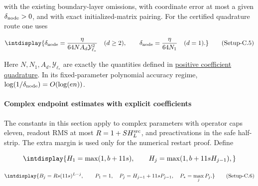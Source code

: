 
with the existing boundary-layer omissions, with coordinate error at most a given \(\delta_{\rm node}>0\), and with exact initialized-matrix pairing. For the certified quadrature route one uses


\label{int:eq-setup-c-5}
\begingroup\renewcommand{\theHequation}{intdisplay.918}
\begin{equation}
\intdisplay{
\delta_{\rm node}=\frac{\eta}{64N A_d\mathcal Y_{\ell_*}^2}\quad(d\ge2),
\qquad \delta_{\rm node}=\frac{\eta}{64N_1}\quad(d=1).
}
\tag{Setup-C.5}
\label{int:eq-0461-setup-c-5}
\end{equation}
\endgroup


Here \(N,\allowbreak N_1,\allowbreak A_d,\allowbreak \mathcal Y_{\ell_*}\) are exactly the quantities defined in \hyperref[int:setup-quadrature]{positive coefficient quadrature}. In its fixed-parameter polynomial accuracy regime, \(\log(1/\delta_{\rm node})=O(\log(en))\).


\paragraph{Complex endpoint estimates with explicit coefficients}
\label{int:setup-core-2}
\mbox{}\par\smallskip


The constants in this section apply to complex parameters with operator caps eleven, readout RMS at most \(R=1+SH_L^{\rm src}\), and preactivations in the safe half-strip. The extra margin is used only for the numerical restart proof. Define


\begingroup\renewcommand{\theHequation}{intdisplay.919}
\begin{equation*}
\intdisplay{
H_1=\max(1,b+11s),\qquad
H_j=\max(1,b+11sH_{j-1}),
}
\end{equation*}
\endgroup

\label{int:eq-setup-c-6}
\begingroup\renewcommand{\theHequation}{intdisplay.920}
\begin{equation}
\intdisplay{
B_j=Rs(11s)^{L-j},\qquad
P_1=1,\quad P_j=H_{j-1}+11sP_{j-1},\quad P_* =\max_jP_j.
}
\tag{Setup-C.6}
\label{int:eq-0462-setup-c-6}
\end{equation}
\endgroup

